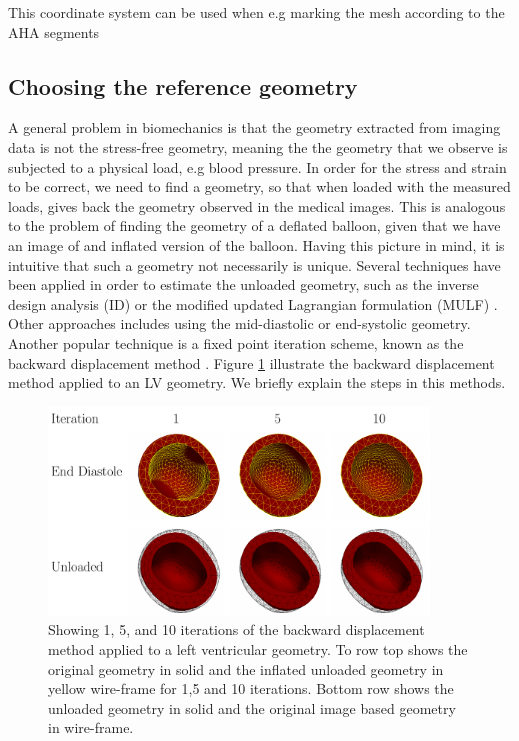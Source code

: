 This coordinate system can be used when e.g marking the mesh according
to the AHA segments

\subsection{Choosing the reference geometry}
\label{sef:reference_geometry}
A general problem in biomechanics is that the geometry extracted from
imaging data is not the stress-free geometry, meaning the the geometry
that we observe is subjected to a physical load, e.g blood
pressure. In order for the stress and strain to be correct, we need to
find a geometry, so that when loaded with the measured loads, gives
back the geometry observed in the medical images. 
This is analogous to the problem of finding the geometry of a deflated balloon, given
that we have an image of and inflated version of the balloon. Having
this picture in mind, it is intuitive that such a geometry not necessarily is unique.
Several techniques have been applied in order to estimate the unloaded
geometry, such as the inverse design analysis (ID)
\cite{govindjee1996computational} or the modified updated Lagrangian
formulation (MULF) \cite{gee2010computational}. Other approaches
includes using the mid-diastolic or end-systolic geometry. Another popular
technique is a fixed point iteration scheme,  known as the
backward displacement method \cite{bols2013computational}. Figure
\ref{fig:unloading_lv} illustrate the backward displacement method applied
to an LV geometry. We briefly explain the steps in this methods.

\begin{figure}[htbp]
  \centering
    \includegraphics[width=0.9\textwidth]{chapters/introduction/figures/unloading/canvas.pdf}
\caption{Showing 1, 5, and 10 iterations of the backward displacement
  method applied to a left ventricular geometry. To row top shows the
  original geometry in solid and the inflated unloaded geometry in
  yellow wire-frame for 1,5 and 10 iterations. Bottom row shows the
  unloaded geometry in solid and the original image based geometry in wire-frame.}
\label{fig:unloading_lv}
\end{figure}


